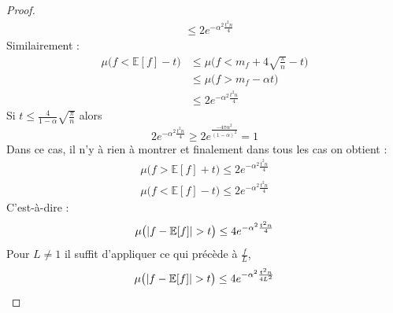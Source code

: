 \documentclass[12pt]{article}
\theoremstyle{definition}
\begin{document}
\begin{proof}
\begin{align*}
	&\leq 2 e^{-\alpha^2\frac{t^2n}{4}}
	\end{align*}
	Similairement :
	\begin{align*}
	\mu\big(f<\mathbb{E}[f]-t\big)&\leq \mu\big(f<m_f+4\sqrt{\frac{\pi}{n}}-t\big)\\
	&\leq \mu\big(f>m_f-\alpha t\big)\\
	&\leq 2 e^{-\alpha^2\frac{t^2n}{4}}
	\end{align*}
	Si $t\leq\frac{4}{1-\alpha}\sqrt{\frac{\pi}{n}}$ alors  
	\begin{equation*}
	2e^{-\alpha^2\frac{t^2n}{4}}\geq 2 e^{\frac{-4\pi\alpha^2}{(1-\alpha)^2}}=1
	\end{equation*}
	Dans ce cas, il n'y à rien à montrer et finalement dans tous les cas on obtient :
	\begin{align*}
		\mu\big(f>\mathbb{E}[f]+t\big) \leq 2 e^{-\alpha^2\frac{t^2n}{4}}\\
		\mu\big(f<\mathbb{E}[f]-t\big)\leq 2 e^{-\alpha^2\frac{t^2n}{4}}
	\end{align*}
	C'est-à-dire : 
	\begin{equation*}
	\mu\big(|f-\mathbb{E}[f]|>t\big) \leq 4 e^{-\alpha^2\frac{t^2n}{4}}\\
	\end{equation*}
	Pour $L\neq 1$ il suffit d'appliquer ce qui précède à $\frac{f}{L}$,
	\begin{equation*}
	\mu\big(|f-\mathbb{E}[f]|>t\big) \leq 4 e^{-\alpha^2\frac{t^2n}{4L^2}}\\
	\end{equation*}
\end{proof}
\end{document}
